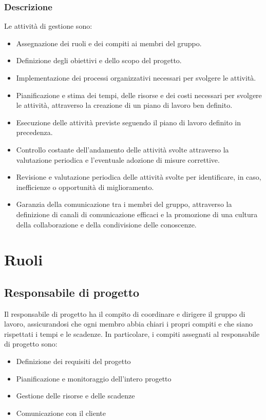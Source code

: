 \subsubsection{Descrizione}

Le attività di gestione sono:

\begin{itemize}
\item Assegnazione dei ruoli e dei compiti ai membri del gruppo.
\item Definizione degli obiettivi e dello scopo del progetto.
\item Implementazione dei processi organizzativi necessari per svolgere le attività.
\item Pianificazione e stima dei tempi, delle risorse e dei costi necessari per svolgere le attività, attraverso la creazione di un piano di lavoro ben definito.
\item Esecuzione delle attività previste seguendo il piano di lavoro definito in precedenza.
\item Controllo costante dell'andamento delle attività svolte attraverso la valutazione periodica e l'eventuale adozione di misure correttive.
\item Revisione e valutazione periodica delle attività svolte per identificare, in caso, inefficienze o opportunità di miglioramento.
\item Garanzia della comunicazione tra i membri del gruppo, attraverso la definizione di canali di comunicazione efficaci e la promozione di una cultura della collaborazione e della condivisione delle conoscenze.
\end{itemize}

\section{Ruoli}

\subsection{Responsabile di progetto}
Il responsabile di progetto ha il compito di coordinare e dirigere il gruppo di lavoro, assicurandosi che ogni membro abbia chiari i propri compiti e che siano rispettati i tempi e le scadenze. In particolare, i compiti assegnati al responsabile di progetto sono:

\begin{itemize}
\item Definizione dei requisiti del progetto
\item Pianificazione e monitoraggio dell'intero progetto
\item Gestione delle risorse e delle scadenze
\item Comunicazione con il cliente
\end{itemize}

